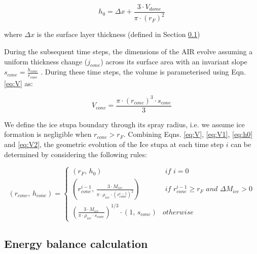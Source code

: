 \begin{equation}
	h_{0} =  \Delta x + \frac{3 \cdot V_{dome}}{\pi \cdot (r_F)^2 }
	\label{eq:h0}
\end{equation}

where $\Delta x$ is the surface layer thickness (defined in Section \ref{sec:energy})

During the subsequent time steps, the dimensions of the AIR evolve assuming a uniform thickness change ($j_{cone}$)
across its surface area with an invariant slope $s_{cone} = \frac{h_{cone}}{r_{cone}}$ .  During these time
steps, the volume is parameterised using Eqn. \ref{eq:V} as:

\begin{equation} V_{cone} = \frac{\pi \cdot {(r_{cone})}^3
		\cdot s_{cone}}{3} \label{eq:V2} \end{equation}

We define the ice stupa boundary through its spray radius, i.e. we assume ice formation is negligible when $r_{cone} >
	r_{F}$. Combining Eqns. \ref{eq:V},  \ref{eq:V1}, \ref{eq:h0} and \ref{eq:V2}, the geometric evolution of the
Ice stupa at each time step $i$ can be determined by considering the following rules:

\begin{equation} (r_{cone},\, h_{cone}) = \left\{ \begin{array}{ll} (r_F ,\, h_0)                                                                          & \textit{ if } i=0 \\
             (r_{cone}^{i-1},\, \frac{3 \cdot M_{ice}}{\pi \cdot \rho_{ice} \cdot {(r_{cone}^{i-1})}^2}) & \textit{ if }
             r_{cone}^{i-1} \geq r_{F} \textit{ and } \Delta M_{ice} > 0                                                     \\ (\frac{3 \cdot M_{ice}}{\pi \cdot \rho_{ice} \cdot s_{cone}})^{1/3} \cdot (1,\,  s_{cone}) &
             otherwise\end{array} \right.  \label{eq:A2} \end{equation}


\subsection{Energy balance calculation} \label{sec:energy}

